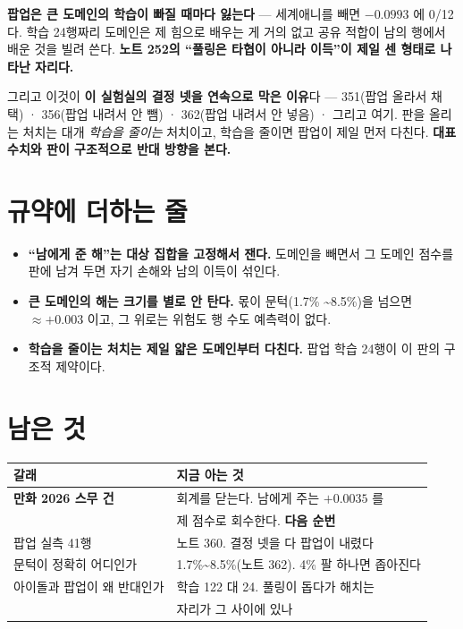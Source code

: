\documentclass[11pt]{article}
\begin{document}
\textbf{팝업은 큰 도메인의 학습이 빠질 때마다 잃는다} --- 세계애니를 빼면
$-0.0993$ 에 0/12 다. 학습 24행짜리 도메인은 제 힘으로 배우는 게 거의
없고 공유 적합이 남의 행에서 배운 것을 빌려 쓴다. \textbf{노트 252의
``풀링은 타협이 아니라 이득''이 제일 센 형태로 나타난 자리다.}

그리고 이것이 \textbf{이 실험실의 결정 넷을 연속으로 막은 이유}다 ---
351(팝업 올라서 채택) · 356(팝업 내려서 안 뺌) · 362(팝업 내려서 안 넣음) ·
그리고 여기. 판을 올리는 처치는 대개 \emph{학습을 줄이는} 처치이고,
학습을 줄이면 팝업이 제일 먼저 다친다. \textbf{대표 수치와 판이 구조적으로
반대 방향을 본다.}

\section{규약에 더하는 줄}

\begin{itemize}
\item \textbf{``남에게 준 해''는 대상 집합을 고정해서 잰다.} 도메인을
빼면서 그 도메인 점수를 판에 남겨 두면 자기 손해와 남의 이득이 섞인다.
\item \textbf{큰 도메인의 해는 크기를 별로 안 탄다.} 몫이 문턱(1.7\%
\textasciitilde{}8.5\%)을 넘으면 $\approx +0.003$ 이고, 그 위로는 위험도
행 수도 예측력이 없다.
\item \textbf{학습을 줄이는 처치는 제일 얇은 도메인부터 다친다.} 팝업
학습 24행이 이 판의 구조적 제약이다.
\end{itemize}

\section{남은 것}

\begin{center}
\begin{tabular}{ll}
\hline
갈래 & 지금 아는 것 \\
\hline
\textbf{만화 2026 스무 건} & 회계를 닫는다. 남에게 주는 $+0.0035$ 를 \\
 & 제 점수로 회수한다. \textbf{다음 순번} \\
팝업 실측 41행 & 노트 360. 결정 넷을 다 팝업이 내렸다 \\
문턱이 정확히 어디인가 & 1.7\%\textasciitilde{}8.5\%(노트 362). 4\% 팔 하나면 좁아진다 \\
아이돌과 팝업이 왜 반대인가 & 학습 122 대 24. 풀링이 돕다가 해치는 \\
 & 자리가 그 사이에 있나 \\
\hline
\end{tabular}
\end{center}
\end{document}
